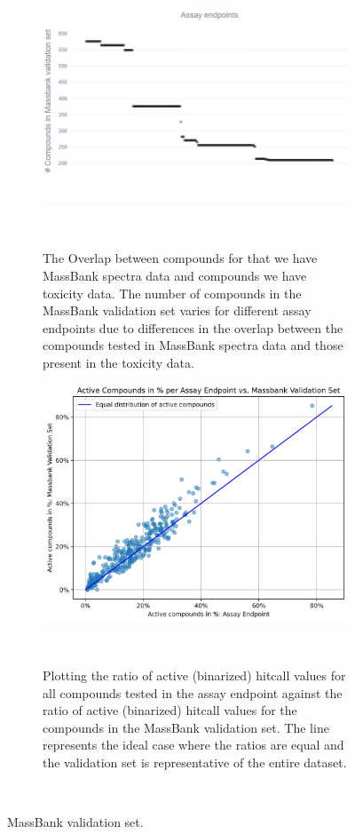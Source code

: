 \begin{figure}
    \centering
    \begin{subfigure}[b]{0.48\textwidth}
        \centering
        \includegraphics[width=\textwidth]{figures/Massbank_overlap.png}
        \caption{The Overlap between compounds for that we have MassBank spectra data and compounds we have toxicity data. The number of compounds in the MassBank validation set varies for different assay endpoints due to differences in the overlap between the compounds tested in MassBank spectra data and those present in the toxicity data.}
    ~\label{fig:MassBank_overlap}
    \end{subfigure}
    \hfill
    \begin{subfigure}[b]{0.48\textwidth}
        \centering
        \includegraphics[width=\textwidth]{figures/activity_ratio_comparison.png}
        \caption{Plotting the ratio of active (binarized) hitcall values for all compounds tested in the assay endpoint against the ratio of active (binarized) hitcall values for the compounds in the MassBank validation set. The line represents the ideal case where the ratios are equal and the validation set is representative of the entire dataset.}
        ~\label{fig:activity_ratio_comparison}
    \end{subfigure}
    \caption{MassBank validation set.}
    ~\label{fig:Massbank_validation}
\end{figure}


